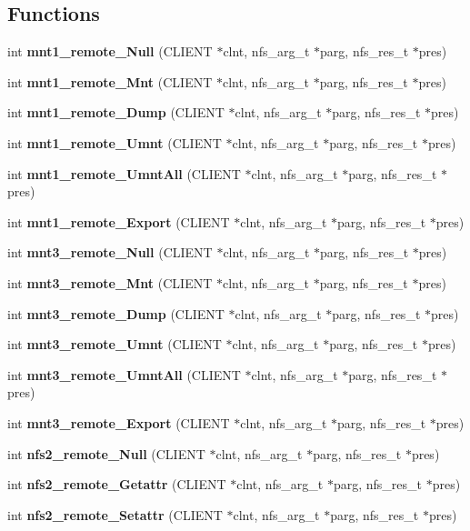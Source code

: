 \subsection*{Functions}
\begin{CompactItemize}
\item 
int {\bf mnt1\_\-remote\_\-Null} (CLIENT $\ast$clnt, nfs\_\-arg\_\-t $\ast$parg, nfs\_\-res\_\-t $\ast$pres)
\item 
int {\bf mnt1\_\-remote\_\-Mnt} (CLIENT $\ast$clnt, nfs\_\-arg\_\-t $\ast$parg, nfs\_\-res\_\-t $\ast$pres)
\item 
int {\bf mnt1\_\-remote\_\-Dump} (CLIENT $\ast$clnt, nfs\_\-arg\_\-t $\ast$parg, nfs\_\-res\_\-t $\ast$pres)
\item 
int {\bf mnt1\_\-remote\_\-Umnt} (CLIENT $\ast$clnt, nfs\_\-arg\_\-t $\ast$parg, nfs\_\-res\_\-t $\ast$pres)
\item 
int {\bf mnt1\_\-remote\_\-UmntAll} (CLIENT $\ast$clnt, nfs\_\-arg\_\-t $\ast$parg, nfs\_\-res\_\-t $\ast$pres)
\item 
int {\bf mnt1\_\-remote\_\-Export} (CLIENT $\ast$clnt, nfs\_\-arg\_\-t $\ast$parg, nfs\_\-res\_\-t $\ast$pres)
\item 
int {\bf mnt3\_\-remote\_\-Null} (CLIENT $\ast$clnt, nfs\_\-arg\_\-t $\ast$parg, nfs\_\-res\_\-t $\ast$pres)
\item 
int {\bf mnt3\_\-remote\_\-Mnt} (CLIENT $\ast$clnt, nfs\_\-arg\_\-t $\ast$parg, nfs\_\-res\_\-t $\ast$pres)
\item 
int {\bf mnt3\_\-remote\_\-Dump} (CLIENT $\ast$clnt, nfs\_\-arg\_\-t $\ast$parg, nfs\_\-res\_\-t $\ast$pres)
\item 
int {\bf mnt3\_\-remote\_\-Umnt} (CLIENT $\ast$clnt, nfs\_\-arg\_\-t $\ast$parg, nfs\_\-res\_\-t $\ast$pres)
\item 
int {\bf mnt3\_\-remote\_\-UmntAll} (CLIENT $\ast$clnt, nfs\_\-arg\_\-t $\ast$parg, nfs\_\-res\_\-t $\ast$pres)
\item 
int {\bf mnt3\_\-remote\_\-Export} (CLIENT $\ast$clnt, nfs\_\-arg\_\-t $\ast$parg, nfs\_\-res\_\-t $\ast$pres)
\item 
int {\bf nfs2\_\-remote\_\-Null} (CLIENT $\ast$clnt, nfs\_\-arg\_\-t $\ast$parg, nfs\_\-res\_\-t $\ast$pres)
\item 
int {\bf nfs2\_\-remote\_\-Getattr} (CLIENT $\ast$clnt, nfs\_\-arg\_\-t $\ast$parg, nfs\_\-res\_\-t $\ast$pres)
\item 
int {\bf nfs2\_\-remote\_\-Setattr} (CLIENT $\ast$clnt, nfs\_\-arg\_\-t $\ast$parg, nfs\_\-res\_\-t $\ast$pres)

\end{CompactItemize}
